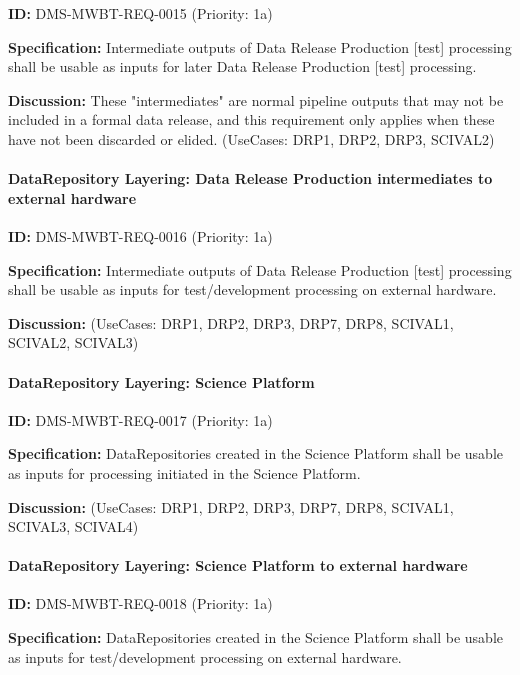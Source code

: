 \documentclass[SE,toc,lsstdraft]{lsstdoc}
\begin{document}
\label{DMS-MWBT-REQ-0015}
\textbf{ID:} DMS-MWBT-REQ-0015 (Priority: 1a)

\textbf{Specification:}
Intermediate outputs of Data Release Production [test] processing shall be usable as inputs for later Data Release Production [test] processing.

\textbf{Discussion:}
These "intermediates" are normal pipeline outputs that may not be included in a formal data release, and this requirement only applies when these have not been discarded or elided. (UseCases: DRP1, DRP2, DRP3, SCIVAL2)

\paragraph{DataRepository Layering: Data Release Production intermediates to external hardware}\hfill  %

\label{DMS-MWBT-REQ-0016}
\textbf{ID:} DMS-MWBT-REQ-0016 (Priority: 1a)

\textbf{Specification:}
Intermediate outputs of Data Release Production [test] processing shall be usable as inputs for test/development processing on external hardware.

\textbf{Discussion:}
(UseCases: DRP1, DRP2, DRP3, DRP7, DRP8, SCIVAL1, SCIVAL2, SCIVAL3)

\paragraph{DataRepository Layering: Science Platform}\hfill  %

\label{DMS-MWBT-REQ-0017}
\textbf{ID:} DMS-MWBT-REQ-0017 (Priority: 1a)

\textbf{Specification:}
DataRepositories created in the Science Platform shall be usable as inputs for processing initiated in the Science Platform.

\textbf{Discussion:}
(UseCases: DRP1, DRP2, DRP3, DRP7, DRP8, SCIVAL1, SCIVAL3, SCIVAL4)

\paragraph{DataRepository Layering: Science Platform to external hardware}\hfill  %

\label{DMS-MWBT-REQ-0018}
\textbf{ID:} DMS-MWBT-REQ-0018 (Priority: 1a)

\textbf{Specification:}
DataRepositories created in the Science Platform shall be usable as inputs for test/development processing on external hardware.
\end{document}
